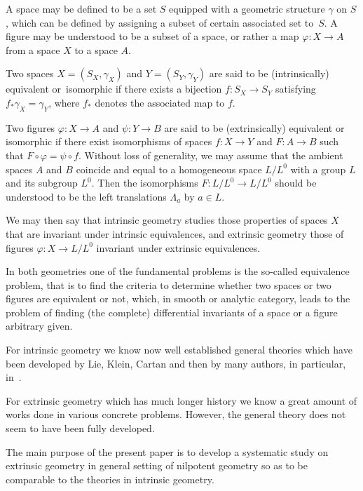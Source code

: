 \documentclass[pdftex]{sigma}%
\numberwithin{equation}{section}
\begin{document}
A space may be defined to be a set $S$ equipped with a geometric structure $\gamma$ on $S$, which can be defined by assigning a subset of certain associated set to~$S$. A figure may be understood to be a subset of a space, or rather a map $\varphi \colon X \to A $ from a space $X$ to a space $A$.

Two spaces $X =(S_X, \gamma_X) $ and $Y =(S_Y, \gamma_Y) $ are said to be (intrinsically) equivalent or~iso\-mor\-phic if there exists a bijection $f\colon S_X \to S_Y $ satisfying $f_* \gamma_X= \gamma_Y$, where $f_* $ denotes the associated map to $f$.

Two figures $\varphi\colon X \to A $ and $ \psi\colon Y \to B $ are said to be (extrinsically) equivalent or isomorphic if there exist isomorphisms of spaces $f\colon X \to Y $ and $F\colon A \to B$ such that $ F\circ \varphi = \psi \circ f $. Without loss of generality, we may assume that the ambient spaces
$A$ and $B$ coincide and equal to a homogeneous space $L/L^0$ with a group $L$ and its subgroup $L^0$. Then the isomorphisms $F\colon L/L^0 \to L/L^0$
should be understood to be the left translations $\Lambda _a $ by $a \in L$.

We may then say that intrinsic geometry studies those properties of spaces $X$ that are invariant under intrinsic equivalences, and extrinsic geometry those of figures $\varphi\colon X \to L/L^0$ invariant under extrinsic equivalences.

In both geometries one of the fundamental problems is the so-called equivalence problem, that is to find the criteria to determine whether two spaces or two figures are equivalent or not, which, in smooth or analytic category, leads to the problem of finding (the complete) differential invariants of a space or a figure arbitrary given.

For intrinsic geometry we know now well established general theories which have been deve\-lo\-ped by Lie, Klein, Cartan and then
by many authors, in particular, in~\cite{car1908,car1936,Mor1983,Mor1993,sin-st65,st64,tan70,tan79}.

For extrinsic geometry which has much longer history we know a great amount of works done in various concrete problems. However, the general theory does not seem to have been fully developed.

The main purpose of the present paper is to develop a systematic study on extrinsic geometry in general setting of nilpotent geometry so as to be comparable to the theories in intrinsic geometry.
\end{document}
